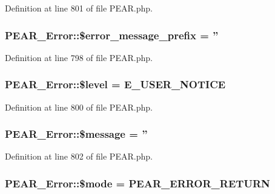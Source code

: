 Definition at line 801 of file P\-E\-A\-R.\-php.

\hypertarget{classPEAR__Error_aea8e8d491c90daabbc7de7ef8d9eef2d}{
\subsubsection[{\$error\-\_\-message\-\_\-prefix}]{\setlength{\rightskip}{0pt plus 5cm}P\-E\-A\-R\-\_\-\-Error\-::\$error\-\_\-message\-\_\-prefix = ''}}\label{classPEAR__Error_aea8e8d491c90daabbc7de7ef8d9eef2d}


Definition at line 798 of file P\-E\-A\-R.\-php.

\hypertarget{classPEAR__Error_a3fad062a32df55f9bd17af007e16cd49}{
\subsubsection[{\$level}]{\setlength{\rightskip}{0pt plus 5cm}P\-E\-A\-R\-\_\-\-Error\-::\$level = E\-\_\-\-U\-S\-E\-R\-\_\-\-N\-O\-T\-I\-C\-E}}\label{classPEAR__Error_a3fad062a32df55f9bd17af007e16cd49}


Definition at line 800 of file P\-E\-A\-R.\-php.

\hypertarget{classPEAR__Error_a21cd38ff638a63b3d6506d994bc488df}{
\subsubsection[{\$message}]{\setlength{\rightskip}{0pt plus 5cm}P\-E\-A\-R\-\_\-\-Error\-::\$message = ''}}\label{classPEAR__Error_a21cd38ff638a63b3d6506d994bc488df}


Definition at line 802 of file P\-E\-A\-R.\-php.

\hypertarget{classPEAR__Error_a37fd8f51c6a1a0df165b7e36c88fbea7}{
\subsubsection[{\$mode}]{\setlength{\rightskip}{0pt plus 5cm}P\-E\-A\-R\-\_\-\-Error\-::\$mode = {\bf P\-E\-A\-R\-\_\-\-E\-R\-R\-O\-R\-\_\-\-R\-E\-T\-U\-R\-N}}}\label{classPEAR__Error_a37fd8f51c6a1a0df165b7e36c88fbea7}


